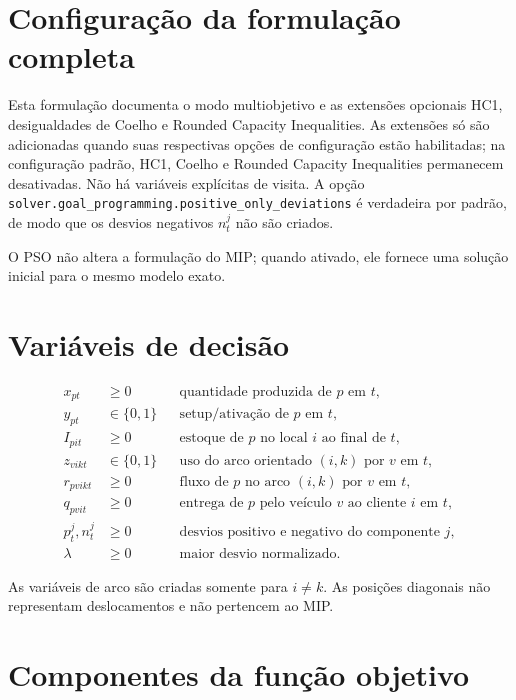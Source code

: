 \documentclass[11pt,a4paper]{article}
\begin{document}
\section{Configuração da formulação completa}

Esta formulação documenta o modo multiobjetivo e as extensões opcionais HC1,
desigualdades de Coelho e Rounded Capacity Inequalities. As extensões só são
adicionadas quando suas respectivas opções de configuração estão habilitadas;
na configuração padrão, HC1, Coelho e Rounded Capacity Inequalities permanecem
desativadas. Não há variáveis explícitas de visita. A opção
\texttt{solver.goal\_programming.positive\_only\_deviations} é verdadeira por
padrão, de modo que os desvios negativos $n_t^j$ não são criados.

O PSO não altera a formulação do MIP; quando ativado, ele fornece uma solução
inicial para o mesmo modelo exato.

\section{Variáveis de decisão}

\begin{align*}
  x_{pt} &\ge 0 &&\text{quantidade produzida de $p$ em $t$},\\
  y_{pt} &\in\{0,1\} &&\text{setup/ativação de $p$ em $t$},\\
  I_{pit} &\ge 0 &&\text{estoque de $p$ no local $i$ ao final de $t$},\\
  z_{vikt} &\in\{0,1\} &&\text{uso do arco orientado $(i,k)$ por $v$ em $t$},\\
  r_{pvikt} &\ge 0 &&\text{fluxo de $p$ no arco $(i,k)$ por $v$ em $t$},\\
  q_{pvit} &\ge 0 &&\text{entrega de $p$ pelo veículo $v$ ao cliente $i$ em $t$},\\
  p_t^j,n_t^j &\ge 0 &&\text{desvios positivo e negativo do componente $j$},\\
  \lambda &\ge 0 &&\text{maior desvio normalizado}.
\end{align*}

As variáveis de arco são criadas somente para $i\ne k$. As posições diagonais
não representam deslocamentos e não pertencem ao MIP.

\section{Componentes da função objetivo}
\end{document}
